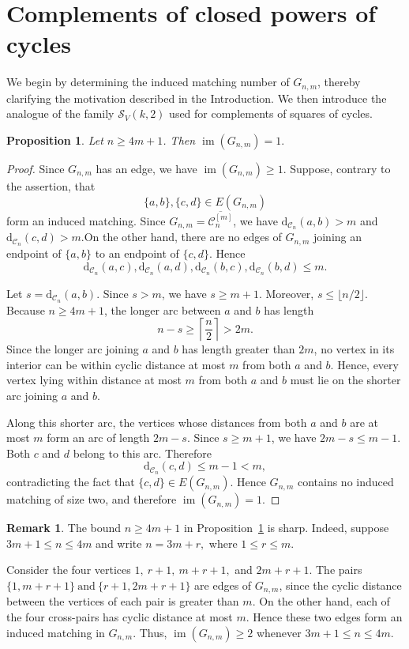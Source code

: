 \documentclass[12pt,reqno]{amsart}
\newtheorem{proposition}[theorem]{Proposition}
\theoremstyle{definition}
\newtheorem{remark}{Remark}
\numberwithin{equation}{section}
\def\C{\mathcal{C}}
\begin{document}
\section{Complements of closed powers of cycles}
\noindent
We begin by determining the induced matching number of $G_{n,m}$,
thereby clarifying the motivation described in the Introduction. We
then introduce the analogue of the family $\mathcal{S}_V(k,2)$ used
for complements of squares of cycles.
\begin{proposition}\label{prop:im}
	Let $n\geq4m+1$. Then \( \operatorname{im}(G_{n,m})=1. \)
\end{proposition}

\begin{proof}
	Since $G_{n,m}$ has an edge, we have
	$\operatorname{im}(G_{n,m})\geq1$. Suppose, contrary to the assertion,
	that
	\[
	\{a,b\},\{c,d\}\in E(G_{n,m})
	\]
	form an induced matching. Since
	$G_{n,m}=\overline{\C_n^{[m]}}$, we have \( \mathrm d_{\C_n}(a,b)>m \) and  \( \mathrm d_{\C_n}(c,d)>m. \)On the other hand, there are no edges of $G_{n,m}$ joining an endpoint
	of $\{a,b\}$ to an endpoint of $\{c,d\}$. Hence
	\[
	\mathrm d_{\C_n}(a,c),
	\mathrm d_{\C_n}(a,d),
	\mathrm d_{\C_n}(b,c),
	\mathrm d_{\C_n}(b,d)
	\leq m.
	\]
	
	Let \( s=\mathrm d_{\C_n}(a,b). \)
	Since $s>m$, we have $s\geq m+1$. Moreover,
	$s\leq\lfloor n/2\rfloor$. Because $n\geq4m+1$, the longer arc between
	$a$ and $b$ has length
	\[
	n-s\geq\left\lceil\frac n2\right\rceil>2m.
	\]
Since the longer arc joining $a$ and $b$ has length greater than
$2m$, no vertex in its interior can be within cyclic distance at most
$m$ from both $a$ and $b$. Hence, every vertex lying within
distance at most $m$ from both $a$ and $b$ must lie on the shorter arc
joining $a$ and $b$.
	
	Along this shorter arc, the vertices whose distances from both $a$ and
	$b$ are at most $m$ form an arc of length \( 2m-s. \) Since $s\geq m+1$, we have \( 2m-s\leq m-1. \)
	Both $c$ and $d$ belong to this arc. Therefore
	\[
	\mathrm d_{\C_n}(c,d)\leq m-1<m,
	\]
	contradicting the fact that $\{c,d\}\in E(G_{n,m})$. Hence $G_{n,m}$ contains no induced matching of size two, and therefore
	\( \operatorname{im}(G_{n,m})=1. \)
\end{proof}
\begin{remark}\label{rem:im}
	The bound $n\geq4m+1$ in Proposition~\ref{prop:im} is sharp. Indeed, suppose \( 3m+1\leq n\leq4m \)
	and write \( n=3m+r, \) where \( 1\leq r\leq m. \)

	Consider the four vertices
	\(
	1,~ r+1,~ m+r+1,\) and \(2m+r+1.
	\)
	The pairs
	\(
	\{1,m+r+1\}
	~\text{and}~
	\{r+1,2m+r+1\}
	\)
	are edges of $G_{n,m}$, since the cyclic distance between the vertices
	of each pair is greater than $m$. On the other hand, each of the four
	cross-pairs has cyclic distance at most $m$. Hence these two edges form
	an induced matching in $G_{n,m}$.
	Thus, \( \operatorname{im}(G_{n,m})\geq2 \)
	whenever \( 3m+1\leq n\leq4m \).

\end{remark}
\end{document}
